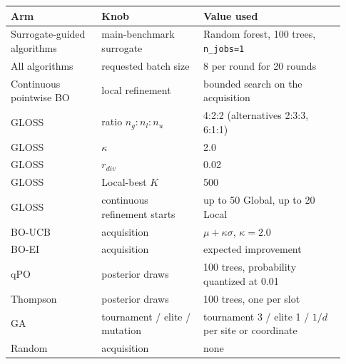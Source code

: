 \begin{tabular}{@{}p{0.25\linewidth}p{0.29\linewidth}p{0.39\linewidth}@{}}
\toprule
Arm & Knob & Value used \\
\midrule
Surrogate-guided algorithms & main-benchmark surrogate & Random forest, 100 trees, \texttt{n\_jobs=1} \\
All algorithms & requested batch size & 8 per round for 20 rounds \\
Continuous pointwise BO & local refinement & bounded search on the acquisition \\
\midrule
GLOSS & ratio $n_g:n_l:n_u$ & 4:2:2 (alternatives 2:3:3, 6:1:1) \\
GLOSS & $\kappa$ & 2.0 \\
GLOSS & $r_{div}$ & 0.02 \\
GLOSS & Local-best $K$ & 500 \\
GLOSS & continuous refinement starts & up to 50 Global, up to 20 Local \\
BO-UCB & acquisition & $\mu + \kappa\sigma$, $\kappa = 2.0$ \\
BO-EI & acquisition & expected improvement \\
qPO & posterior draws & 100 trees, probability quantized at 0.01 \\
Thompson & posterior draws & 100 trees, one per slot \\
GA & tournament / elite / mutation & tournament 3 / elite 1 / $1/d$ per site or coordinate \\
Random & acquisition & none \\
\bottomrule
\end{tabular}
